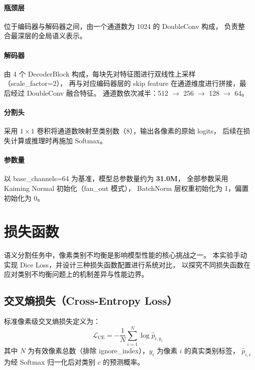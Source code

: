 \documentclass[12pt, a4paper]{article}
\begin{document}
\paragraph{瓶颈层}
位于编码器与解码器之间，由一个通道数为 1024 的 DoubleConv 构成，
负责整合最深层的全局语义表示。

\paragraph{解码器}
由 4 个 DecoderBlock 构成，每块先对特征图进行双线性上采样（scale\_factor=2），
再与对应编码器层的 skip feature 在通道维度进行拼接，最后经过 DoubleConv 融合特征。
通道数依次减半：512 $\to$ 256 $\to$ 128 $\to$ 64。

\paragraph{分割头}
采用 $1\times1$ 卷积将通道数映射至类别数（8），输出各像素的原始 logits，
后续在损失计算或推理时再施加 Softmax。

\paragraph{参数量}
以 base\_channels=64 为基准，模型总参数量约为 \textbf{31.0M}，
全部参数采用 Kaiming Normal 初始化（fan\_out 模式），
BatchNorm 层权重初始化为 1，偏置初始化为 0。

\section{损失函数}

语义分割任务中，像素类别不均衡是影响模型性能的核心挑战之一。
本实验手动实现 Dice Loss，并设计三种损失函数配置进行系统对比，
以探究不同损失函数在应对类别不均衡问题上的机制差异与性能边界。

\subsection{交叉熵损失（Cross-Entropy Loss）}

标准像素级交叉熵损失定义为：
\[
    \mathcal{L}_{\text{CE}} = -\frac{1}{N} \sum_{i=1}^{N} \log \hat{p}_{i, y_i}
\]
其中 $N$ 为有效像素总数（排除 ignore\_index），$y_i$ 为像素 $i$ 的真实类别标签，
$\hat{p}_{i,c}$ 为经 Softmax 归一化后对类别 $c$ 的预测概率。
\end{document}
